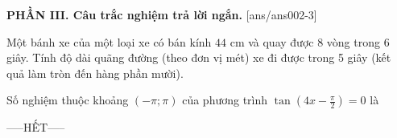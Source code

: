 \documentclass[12pt,a4paper]{article}
\begin{document}
{\bf PHẦN III. Câu trắc nghiệm trả lời ngắn.}
\setcounter{ex}{0}
[ans/ans002-3]
\begin{ex}
 Một bánh xe của một loại xe có bán kính ${44}$ cm và quay được 8 vòng trong 6 giây. Tính độ dài quãng đường (theo đơn vị mét) xe đi được trong 5 giây (kết quả làm tròn đến hàng phần mười). 

\end{ex}

\begin{ex}
 Số nghiệm thuộc khoảng $(- \pi;\pi)$ của phương trình $\tan \left(4 x - \frac{\pi}{2}\right)=0$ là

\end{ex}


 \begin{center}
-----HẾT-----
\end{center}

\newpage 
\end{document}

